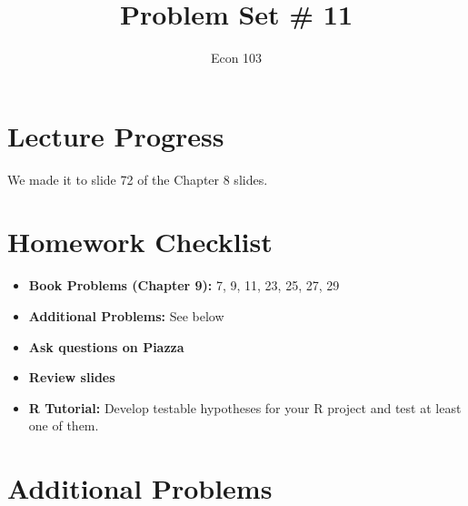 \documentclass[addpoints,12pt]{exam}\usepackage[]{graphicx}\usepackage[]{color}
\title{Problem Set \# 11}
\author{Econ 103}
\date{}
\begin{document}
\maketitle

\section*{Lecture Progress}
We made it to slide 72 of the Chapter 8 slides.

\section*{Homework Checklist}

\begin{itemize}[label = $\square$]
	\item \textbf{Book Problems (Chapter 9):} 7, 9, 11, 23, 25, 27, 29
	\item \textbf{Additional Problems: }See below
	\item \textbf{Ask questions on Piazza}
	\item\textbf{Review slides}
	\item\textbf{R Tutorial:} Develop testable hypotheses for your R project and test at least one of them.
\end{itemize}

\section*{Additional Problems}
\end{document}
